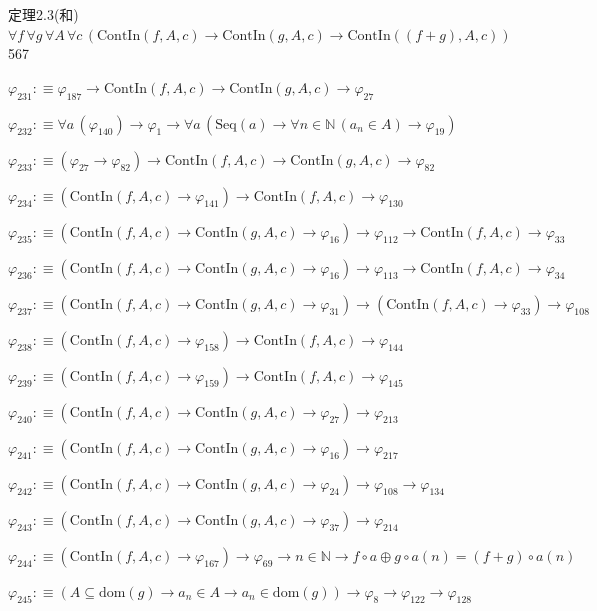 \begin{fullproof}{定理2.3(和)}{$\forall f\,\forall g\,\forall A\,\forall c\,(\mathrm{ContIn}(f,A,c) \to \mathrm{ContIn}(g,A,c) \to \mathrm{ContIn}((f + g),A,c))$}{567}
\begin{abbrevlist}
\item $\varphi_{231} :\equiv \varphi_{187} \to \mathrm{ContIn}(f,A,c) \to \mathrm{ContIn}(g,A,c) \to \varphi_{27}$
\item $\varphi_{232} :\equiv \forall a\,(\varphi_{140}) \to \varphi_{1} \to \forall a\,(\mathrm{Seq}(a) \to \forall n \in \mathbb{N}\,(a_{n} \in A) \to \varphi_{19})$
\item $\varphi_{233} :\equiv (\varphi_{27} \to \varphi_{82}) \to \mathrm{ContIn}(f,A,c) \to \mathrm{ContIn}(g,A,c) \to \varphi_{82}$
\item $\varphi_{234} :\equiv (\mathrm{ContIn}(f,A,c) \to \varphi_{141}) \to \mathrm{ContIn}(f,A,c) \to \varphi_{130}$
\item $\varphi_{235} :\equiv (\mathrm{ContIn}(f,A,c) \to \mathrm{ContIn}(g,A,c) \to \varphi_{16}) \to \varphi_{112} \to \mathrm{ContIn}(f,A,c) \to \varphi_{33}$
\item $\varphi_{236} :\equiv (\mathrm{ContIn}(f,A,c) \to \mathrm{ContIn}(g,A,c) \to \varphi_{16}) \to \varphi_{113} \to \mathrm{ContIn}(f,A,c) \to \varphi_{34}$
\item $\varphi_{237} :\equiv (\mathrm{ContIn}(f,A,c) \to \mathrm{ContIn}(g,A,c) \to \varphi_{31}) \to (\mathrm{ContIn}(f,A,c) \to \varphi_{33}) \to \varphi_{108}$
\item $\varphi_{238} :\equiv (\mathrm{ContIn}(f,A,c) \to \varphi_{158}) \to \mathrm{ContIn}(f,A,c) \to \varphi_{144}$
\item $\varphi_{239} :\equiv (\mathrm{ContIn}(f,A,c) \to \varphi_{159}) \to \mathrm{ContIn}(f,A,c) \to \varphi_{145}$
\item $\varphi_{240} :\equiv (\mathrm{ContIn}(f,A,c) \to \mathrm{ContIn}(g,A,c) \to \varphi_{27}) \to \varphi_{213}$
\item $\varphi_{241} :\equiv (\mathrm{ContIn}(f,A,c) \to \mathrm{ContIn}(g,A,c) \to \varphi_{16}) \to \varphi_{217}$
\item $\varphi_{242} :\equiv (\mathrm{ContIn}(f,A,c) \to \mathrm{ContIn}(g,A,c) \to \varphi_{24}) \to \varphi_{108} \to \varphi_{134}$
\item $\varphi_{243} :\equiv (\mathrm{ContIn}(f,A,c) \to \mathrm{ContIn}(g,A,c) \to \varphi_{37}) \to \varphi_{214}$
\item $\varphi_{244} :\equiv (\mathrm{ContIn}(f,A,c) \to \varphi_{167}) \to \varphi_{69} \to n \in \mathbb{N} \to f \circ a \oplus g \circ a(n) = (f + g) \circ a(n)$
\item $\varphi_{245} :\equiv (A \subseteq \mathrm{dom}(g) \to a_{n} \in A \to a_{n} \in \mathrm{dom}(g)) \to \varphi_{8} \to \varphi_{122} \to \varphi_{128}$

\end{abbrevlist}
\end{fullproof}
